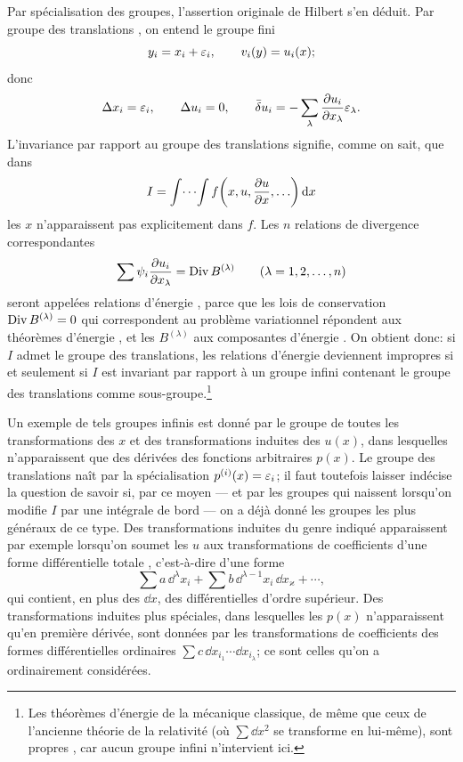 Par spécialisation des groupes, l'assertion originale de Hilbert s'en déduit. Par \og groupe des translations \fg{}, on entend le groupe fini
\[
y_i=x_i+\varepsilon_i,\qquad v_i(y)=u_i(x);
\]
donc
\[
\Delta x_i=\varepsilon_i,\qquad \Delta u_i=0,\qquad
\bar{\delta} u_i=-\sum_\lambda\frac{\partial u_i}{\partial x_\lambda}\varepsilon_\lambda.
\]
L'invariance par rapport au groupe des translations signifie, comme on sait, que dans
\[
I=\int\!\cdots\!\int f\!\left(x,u,\frac{\partial u}{\partial x},\ldots\right)\mathrm d x
\]
les \(x\) n'apparaissent pas explicitement dans \(f\). Les \(n\) relations de divergence correspondantes
\[
\sum\psi_i\frac{\partial u_i}{\partial x_\lambda}=\operatorname{Div} B^{(\lambda)}
\qquad(\lambda=1,2,\ldots,n)
\]
seront appelées \og relations d'énergie \fg{}, parce que les \og lois de conservation \fg{} \(\operatorname{Div} B^{(\lambda)}=0\) qui correspondent au problème variationnel répondent aux \og théorèmes d'énergie \fg{}, et les \(B^{(\lambda)}\) aux \og composantes d'énergie \fg{}. On obtient donc: si \(I\) admet le groupe des translations, les relations d'énergie deviennent impropres si et seulement si \(I\) est invariant par rapport à un groupe infini contenant le groupe des translations comme sous-groupe.\footnote{Les théorèmes d'énergie de la mécanique classique, de même que ceux de l'ancienne \og théorie de la relativité \fg{} (où \(\sum \dd x^2\) se transforme en lui-même), sont \og propres \fg{}, car aucun groupe infini n'intervient ici.}

Un exemple de tels groupes infinis est donné par le groupe de toutes les transformations des \(x\) et des transformations induites des \(u(x)\), dans lesquelles n'apparaissent que des dérivées des fonctions arbitraires \(p(x)\). Le groupe des translations naît par la spécialisation \(p^{(i)}(x)=\varepsilon_i\); il faut toutefois laisser indécise la question de savoir si, par ce moyen --- et par les groupes qui naissent lorsqu'on modifie \(I\) par une intégrale de bord --- on a déjà donné les groupes les plus généraux de ce type. Des transformations induites du genre indiqué apparaissent par exemple lorsqu'on soumet les \(u\) aux transformations de coefficients d'une \og forme différentielle totale \fg{}, c'est-à-dire d'une forme
\[
\sum a\,\dd^\lambda x_i+\sum b\,\dd^{\lambda-1}x_i\,\dd x_\varkappa+\cdots,
\]
qui contient, en plus des \(\dd x\), des différentielles d'ordre supérieur. Des transformations induites plus spéciales, dans lesquelles les \(p(x)\) n'apparaissent qu'en première dérivée, sont données par les transformations de coefficients des formes différentielles ordinaires \(\sum c\,\dd x_{i_1}\cdots \dd x_{i_\lambda}\); ce sont celles qu'on a ordinairement considérées.

